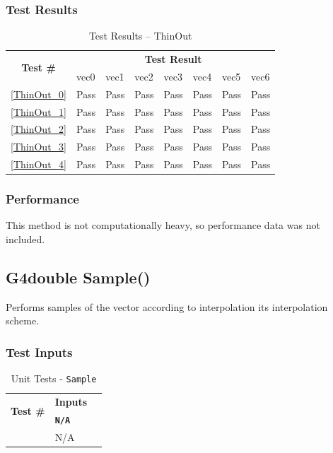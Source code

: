 \documentclass[12pt]{article}
\newcounter{TestCounter}
\begin{document}
	\subsubsection{Test Results}
		\begin{table}[H]
		\centering
		\caption{Test Results -- ThinOut}\label{ThinOut_acc}
		\begin{tabular}{clllllll}
		\toprule
		\multirow{2}{*}{\bf Test \#} & \multicolumn{7}{c}{\bf Test Result}\\
		& vec0 & vec1 & vec2 & vec3 & vec4 & vec5 & vec6\\\midrule
		\ref{ThinOut_0} & Pass & Pass & Pass & Pass & Pass & Pass & Pass\\
		\ref{ThinOut_1} & Pass & Pass & Pass & Pass & Pass & Pass & Pass\\
		\ref{ThinOut_2} & Pass & Pass & Pass & Pass & Pass & Pass & Pass\\
		\ref{ThinOut_3} & Pass & Pass & Pass & Pass & Pass & Pass & Pass\\
		\ref{ThinOut_4} & Pass & Pass & Pass & Pass & Pass & Pass & Pass\\
		\bottomrule
		\end{tabular}
		\end{table}

	\subsubsection{Performance}
		This method is not computationally heavy, so performance data was not included.

\subsection{G4double Sample()}
	
	  Performs samples of the vector according to interpolation its interpolation scheme.
	
	\subsubsection{Test Inputs}
		\begin{table}[H]
		\centering
		\caption{Unit Tests - \texttt{Sample}}\label{Sample_unit}
		\begin{tabular}{lll}
		\toprule
		\multirow{2}{*}{\bf Test \#}  & \multicolumn{1}{c}{\bf Inputs}\\
		& \bf \texttt{N/A}\\\midrule
		{TestCounter}\arabic{TestCounter}\label{Sample_0} & N/A \\
		\bottomrule
		\end{tabular}
		\end{table}
	
\end{document}
